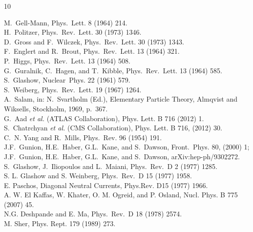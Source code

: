 ﻿%
\begin{thebibliography}{10}

M.~Gell-Mann, Phys.~Lett. 8 (1964) 214.
\\
H.~Politzer, Phys.~Rev.~Lett. 30 (1973) 1346.
\\
D.~Gross and F.~Wilczek, Phys.~Rev.~Lett. 30 (1973) 1343.
\\
F.~Englert and R.~Brout, Phys.~Rev.~Lett. 13 (1964) 321.
\\
P.~Higgs, Phys.~Rev.~Lett. 13 (1964) 508.
\\
G.~Guralnik, C.~Hagen, and T.~Kibble, Phys.~Rev.~Lett. 13 (1964) 585.
\\
S.~Glashow, Nuclear~Phys. 22 (1961) 579.
\\
S.~Weiberg, Phys.~Rev.~Lett. 19 (1967) 1264.
\\
A.~Salam, in: N.~Svartholm (Ed.), Elementary Particle Theory, Almqvist and Wiksells, Stockholm,
1969, p.~367.
\\
G.~Aad {\it et al.} (ATLAS Collaboration), Phys. Lett. B 716 (2012) 1.
\\
S.~Chatrchyan {\it et al.} (CMS Collaboration), Phys. Lett. B 716, (2012) 30.
\\
C.~N. Yang and R.~Mills, Phys.~Rev. 96 (1954) 191.
\\
J.F.~Gunion, H.E.~Haber, G.L.~Kane, and S.~Dawson, Front.~Phys. 80, (2000) 1;\\
J.F.~Gunion, H.E.~Haber, G.L.~Kane, and S.~Dawson, arXiv:hep-ph/9302272.
\\
S.~Glashow, J.~Iliopoulos and L.~Maiani, Phys.~Rev.~D 2 (1977) 1285.
\\
S. L. Glashow and S. Weinberg, Phys.~Rev.~D 15 (1977) 1958.
\\
E. Paschos, Diagonal Neutral Currents, Phys.Rev. D15 (1977) 1966.
\\
A. W. El Kaffas, W. Khater, O. M. Ogreid, and P. Osland, Nucl. Phys. B 775 (2007) 45.
\\
N.G. Deshpande and E. Ma, Phys.~Rev.~D 18 (1978) 2574.
\\
M. Sher, Phys. Rept. 179 (1989) 273.
\\

\end{thebibliography}
